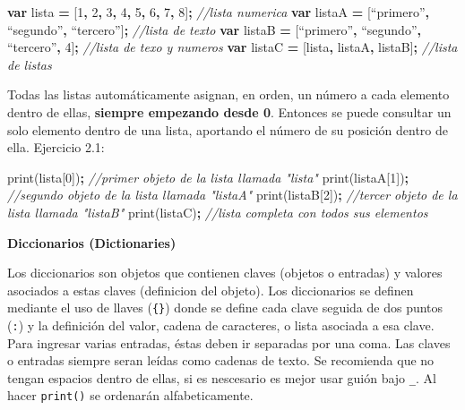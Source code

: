 \documentclass[
]{article}
\newenvironment{Shaded}{\begin{snugshade}}{\end{snugshade}}
\newcommand{\AttributeTok}[1]{\textcolor[rgb]{0.77,0.63,0.00}{#1}}
\newcommand{\CommentTok}[1]{\textcolor[rgb]{0.56,0.35,0.01}{\textit{#1}}}
\newcommand{\DecValTok}[1]{\textcolor[rgb]{0.00,0.00,0.81}{#1}}
\newcommand{\KeywordTok}[1]{\textcolor[rgb]{0.13,0.29,0.53}{\textbf{#1}}}
\newcommand{\NormalTok}[1]{#1}
\newcommand{\OperatorTok}[1]{\textcolor[rgb]{0.81,0.36,0.00}{\textbf{#1}}}
\begin{document}
\begin{Shaded}
\begin{Highlighting}[]
\KeywordTok{var}\NormalTok{ lista }\OperatorTok{=}\NormalTok{ [}\DecValTok{1}\OperatorTok{,} \DecValTok{2}\OperatorTok{,} \DecValTok{3}\OperatorTok{,} \DecValTok{4}\OperatorTok{,} \DecValTok{5}\OperatorTok{,} \DecValTok{6}\OperatorTok{,} \DecValTok{7}\OperatorTok{,} \DecValTok{8}\NormalTok{]}\OperatorTok{;}                 \CommentTok{//lista numerica }
\KeywordTok{var}\NormalTok{ listaA }\OperatorTok{=}\NormalTok{ [“primero”}\OperatorTok{,}\NormalTok{ “segundo”}\OperatorTok{,}\NormalTok{ “tercero”]}\OperatorTok{;}       \CommentTok{//lista de texto}
\KeywordTok{var}\NormalTok{ listaB }\OperatorTok{=}\NormalTok{ [“primero”}\OperatorTok{,}\NormalTok{ “segundo”}\OperatorTok{,}\NormalTok{ “tercero”}\OperatorTok{,} \DecValTok{4}\NormalTok{]}\OperatorTok{;}    \CommentTok{//lista de texo y numeros}
\KeywordTok{var}\NormalTok{ listaC }\OperatorTok{=}\NormalTok{ [lista}\OperatorTok{,}\NormalTok{ listaA}\OperatorTok{,}\NormalTok{ listaB]}\OperatorTok{;}                 \CommentTok{//lista de listas}
\end{Highlighting}
\end{Shaded}

Todas las listas automáticamente asignan, en orden, un número a cada
elemento dentro de ellas, \textbf{siempre empezando desde 0}. Entonces
se puede consultar un solo elemento dentro de una lista, aportando el
número de su posición dentro de ella. Ejercicio 2.1:

\begin{Shaded}
\begin{Highlighting}[]
\AttributeTok{print}\NormalTok{(lista[}\DecValTok{0}\NormalTok{])}\OperatorTok{;}  \CommentTok{//primer objeto de la lista llamada "lista"}
\AttributeTok{print}\NormalTok{(listaA[}\DecValTok{1}\NormalTok{])}\OperatorTok{;} \CommentTok{//segundo objeto de la lista llamada "listaA"}
\AttributeTok{print}\NormalTok{(listaB[}\DecValTok{2}\NormalTok{])}\OperatorTok{;} \CommentTok{//tercer objeto de la lista llamada "listaB"}
\AttributeTok{print}\NormalTok{(listaC)}\OperatorTok{;}    \CommentTok{//lista completa con todos sus elementos}
\end{Highlighting}
\end{Shaded}

\textbf{Diccionarios (Dictionaries)}

Los diccionarios son objetos que contienen claves (objetos o entradas) y
valores asociados a estas claves (definicion del objeto). Los
diccionarios se definen mediante el uso de llaves (\texttt{\{\}}) donde
se define cada clave seguida de dos puntos (\texttt{:}) y la definición
del valor, cadena de caracteres, o lista asociada a esa clave. Para
ingresar varias entradas, éstas deben ir separadas por una coma. Las
claves o entradas siempre seran leídas como cadenas de texto. Se
recomienda que no tengan espacios dentro de ellas, si es nescesario es
mejor usar guión bajo \texttt{\_}. Al hacer \texttt{print()} se
ordenarán alfabeticamente.
\end{document}
